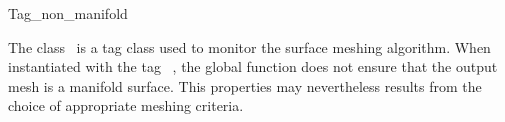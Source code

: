 

\begin{ccRefClass}{Tag_non_manifold}  %


\ccDefinition
  
The class \ccRefName\ is a tag class used to monitor the
surface meshing algorithm. When instantiated with the tag
\ccRefName\ , the global function 
does not ensure that the output mesh  is a  manifold surface.
This properties may nevertheless results from the choice of
appropriate meshing criteria.











\ccSeeAlso

\\
 \\
 \\




\end{ccRefClass}


